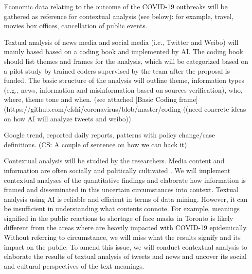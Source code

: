 Economic data relating to the outcome of the COVID-19 outbreaks will be gathered as reference for contextual analysis (see below): for example, travel, movies box offices, cancellation of public events.





Textual analysis of news media and social media (i.e., Twitter and Weibo) will mainly based based on a coding book and implemented by AI.  The coding book should list themes and frames for the analysis, which will be categorized based on a pilot study by trained coders supervised by the team after the proposal is funded.  The basic structure of the analysis will outline theme, information types  (e.g., news, information and misinformation based on sources verification), who, where, theme tone and when.  (see  attached [Basic Coding frame](https://github.com/cfshi/coronavirus/blob/master/coding%
((need concrete ideas on how AI will analyze tweets and weibo)) 


Google trend, reported daily reports, patterns with policy change/case definitions. (CS: A couple of sentence on how we can hack it)

Contextual analysis will be studied by the researchers.  Media content and information are often socially and politically cultivated \cite{}.  We will implement contextual analyses of the quantitative findings and elaborate how information is framed and disseminated in this uncertain circumstances into context.  Textual analysis using AI is reliable and efficient in terms of data mining.  However, it can be insufficient in understanding what contents connote.  For example, meanings signified in the public reactions to shortage of face masks in Toronto is likely different from  the areas where are heavily impacted with COVID-19 epidemically.  Without referring to circumstance, we will miss what the results signify and its impact on the public.  To amend this issue, we will conduct contextual analysis \citep{} to elaborate the results of textual analysis of tweets and news and uncover its social and cultural perspectives of the text meanings.

